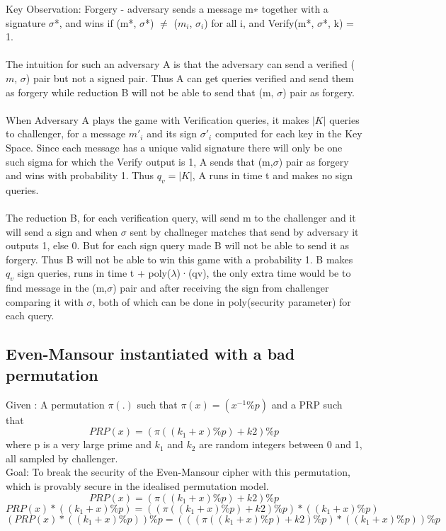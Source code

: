 \documentclass{article}
\begin{document}
Key Observation: Forgery - adversary sends a message m∗ together with a signature $\sigma$*, and wins if (m*, $\sigma$*) $\neq$ ($m_i$, $\sigma_i$) for all i, and Verify(m*, $\sigma$*, k) = 1. \\ \\
The intuition for such an adversary A is that the adversary can send a verified ($m$, $\sigma$) pair but not a signed pair. Thus A can get queries verified and send them as forgery while reduction B will not be able to send that (m, $\sigma$) pair as forgery.  \\ \\
When Adversary A plays the game with Verification queries, it makes $|K|$ queries to challenger, for a message $m'_i$ and its sign $\sigma'_i$ computed for each key in the Key Space. Since each message has a unique valid signature there will only be one such sigma for which the Verify output is 1, A sends that (m,$\sigma$) pair as forgery and wins with probability 1. Thus $q_v=|K|$, A runs in time t and makes no sign queries.\\ \\
The reduction B, for each verification query, will send m to the challenger and it will send a sign and when $\sigma$ sent by challneger matches that send by adversary it outputs 1, else 0. But for each sign query made B will not be able to send it as forgery. Thus B will not be able to win this game with a probability 1. B makes $q_v$ sign queries, runs in time t + poly($\lambda$)·(qv), the only extra time would be to find message in the (m,$\sigma$) pair and after receiving the sign from challenger comparing it with $\sigma$, both of which can be done in poly(security parameter) for each query. 

\newpage
\subsection{Even-Mansour instantiated with a bad permutation}
Given : A permutation $\pi(.)$ such that $\pi(x)= (x^{-1}  \% p)$ and a PRP such that \[PRP(x) = (\pi((k_1+x)\% p)+k2)\% p\]where p is a very large prime and $k_1$ and $k_2$ are random integers between 0 and 1, all sampled by challenger. \\
Goal: To break the security of the Even-Mansour cipher with this permutation, which is provably secure in the idealised permutation model.
\[PRP(x) =(\pi((k_1+x)\% p)+k2)\% p\]
\[PRP(x) * ((k_1+x) \% p) = ((\pi((k_1+x)\% p)+k2)\% p) *((k_1+x)\% p)\]
\[(PRP(x) * ((k_1+x) \% p))\% p = (((\pi((k_1+x)\% p)+k2)\% p) *((k_1+x)\% p))\% p\]
\end{document}
